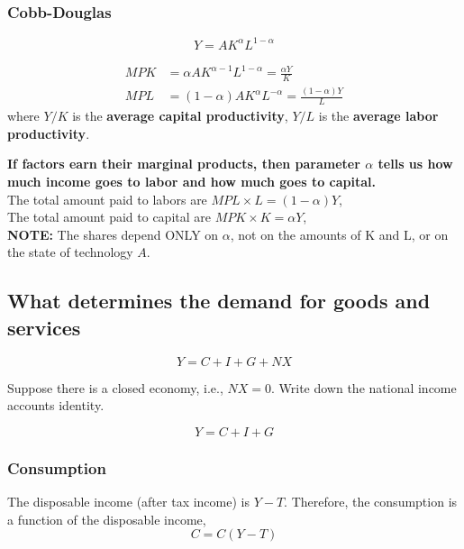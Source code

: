 \documentclass[12pt]{article}
\begin{document}
\subsubsection{Cobb-Douglas}

\begin{equation*}
Y = AK^{\alpha}L^{1 - \alpha}
\end{equation*}

\begin{align*}
MPK &= \alpha AK^{\alpha - 1}L^{1 - \alpha} = \frac{\alpha Y}{K}\\
MPL &= (1 - \alpha)AK^{\alpha}L^{ - \alpha} = \frac{(1 - \alpha)Y}{L}
\end{align*}
where $ Y/K $ is the {\textbf {average capital productivity}}, $ Y/L $ is the 
{\textbf {average labor productivity}}.


{\textbf {If factors earn their marginal products, then parameter $ \alpha $ tells us
how much income goes to labor and how much goes to capital.}}\\
The total amount paid to labors are $ MPL  \times L = (1 - \alpha)Y $,\\
The total amount paid to capital are $ MPK  \times K = \alpha Y $,\\
{\textbf {NOTE:}} The shares depend ONLY on $ \alpha $, not on the amounts of K and L, or
on the state of technology $ A $.


\subsection{What determines the demand for goods and services}

\begin{equation*}
Y = C + I + G + NX
\end{equation*}

Suppose there is a closed economy, i.e., $ NX = 0 $. Write down the national income 
accounts identity.

\begin{equation*}
Y = C + I + G
\end{equation*}

\subsubsection{Consumption}
The disposable income (after tax income) is $ Y - T $. Therefore, the consumption is
a function of the disposable income,
\begin{equation*}
C = C(Y - T)
\end{equation*}
\end{document}
